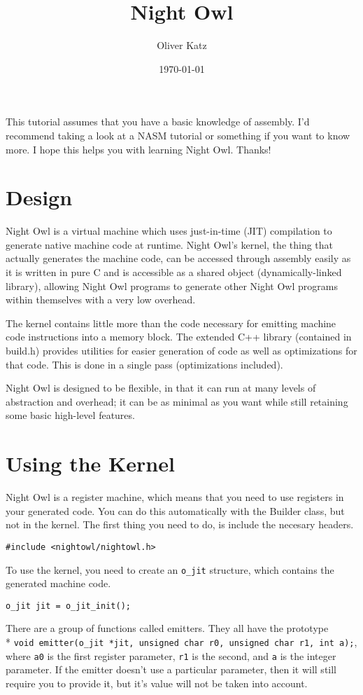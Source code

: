 \documentclass[10pt,a4paper]{article}
\author{Oliver Katz}
\title{Night Owl}
\date{\today}
\begin{document}
\maketitle

This tutorial assumes that you have a basic knowledge of assembly. I'd recommend taking a look at a NASM tutorial or something if you want to know more. I hope this helps you with learning Night Owl. Thanks!

\section{Design}
Night Owl is a virtual machine which uses just-in-time (JIT) compilation to generate native machine code at runtime. Night Owl's kernel, the thing that actually generates the machine code, can be accessed through assembly easily as it is written in pure C and is accessible as a shared object (dynamically-linked library), allowing Night Owl programs to generate other Night Owl programs within themselves with a very low overhead.

The kernel contains little more than the code necessary for emitting machine code instructions into a memory block. The extended C++ library (contained in build.h) provides utilities for easier generation of code as well as optimizations for that code. This is done in a single pass (optimizations included). 

Night Owl is designed to be flexible, in that it can run at many levels of abstraction and overhead; it can be as minimal as you want while still retaining some basic high-level features. 

\section{Using the Kernel}
Night Owl is a register machine, which means that you need to use registers in your generated code. You can do this automatically with the Builder class, but not in the kernel. The first thing you need to do, is include the necesary headers.
\begin{verbatim}
#include <nightowl/nightowl.h>
\end{verbatim}

To use the kernel, you need to create an \verb|o_jit| structure, which contains the generated machine code. 
\begin{verbatim}
o_jit jit = o_jit_init();
\end{verbatim}

There are a group of functions called emitters. They all have the prototype \\* \verb|void emitter(o_jit *jit, unsigned char r0, unsigned char r1, int a);|, where \verb|a0| is the first register parameter, \verb|r1| is the second, and \verb|a| is the integer parameter. If the emitter doesn't use a particular parameter, then it will still require you to provide it, but it's value will not be taken into account. 
\end{document}
